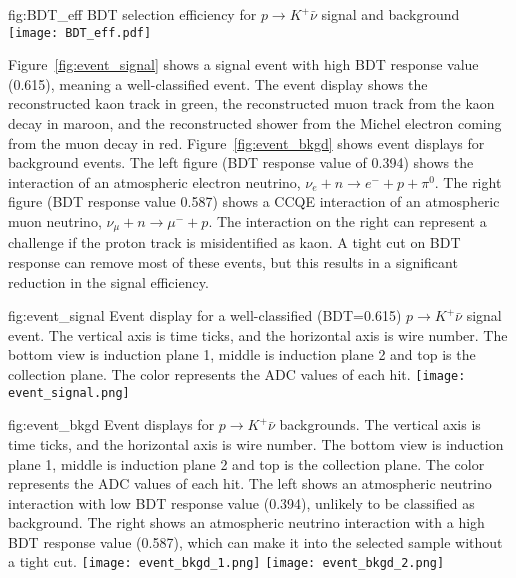 \begin{dunefigure}
{fig:BDT_eff}
{BDT selection efficiency for $p\rightarrow K^{+} \bar{\nu}$ signal and background}
\texttt{[image: BDT\_eff.pdf]}
\end{dunefigure} 

Figure~\ref{fig:event_signal} shows a signal event with high BDT response value (0.615), meaning a well-classified event. The event display shows the reconstructed kaon track in green, the reconstructed muon track from the kaon decay in maroon, and the reconstructed shower from the Michel electron coming from the muon decay in red. Figure~\ref{fig:event_bkgd} shows event displays for background events.  The left figure (BDT response value of 0.394) shows the interaction of an atmospheric electron neutrino, $\nu_{e}+n\rightarrow e^{-}+p+\pi^{0}$. The right figure (BDT response value 0.587) shows a CCQE interaction of an atmospheric muon neutrino, $\nu_{
\mu}+n \rightarrow \mu^{-}+p$. The interaction on the right can represent a challenge if the proton track is misidentified as kaon. A tight cut on BDT response can remove most of these events, but this results in a significant reduction in the signal efficiency.

\begin{dunefigure}
{fig:event_signal}
{Event display for a well-classified (BDT=0.615) $p\rightarrow K^{+} \bar{\nu}$ signal event.  The vertical axis is time ticks, and the horizontal axis is wire number. The bottom view is induction plane 1, middle is induction plane 2 and top is the collection plane. The color represents the ADC values of each hit. }
\texttt{[image: event\_signal.png]}
\end{dunefigure} 

\begin{dunefigure}
{fig:event_bkgd}
{Event displays for $p\rightarrow K^{+} \bar{\nu}$ backgrounds.  The vertical axis is time ticks, and the horizontal axis is wire number. The bottom view is induction plane 1, middle is induction plane 2 and top is the collection plane. The color represents the ADC values of each hit. The left shows an atmospheric neutrino interaction with low BDT response value (0.394), unlikely to be classified as background. The right shows an atmospheric neutrino interaction with a high BDT response value (0.587), which can make it into the selected sample without a tight cut.}
\texttt{[image: event\_bkgd\_1.png]}
\texttt{[image: event\_bkgd\_2.png]}
\end{dunefigure}

